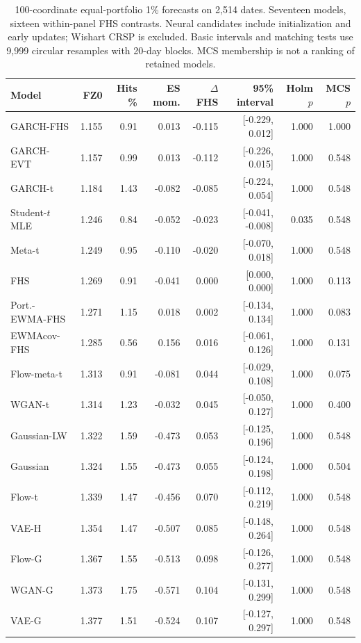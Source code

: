 \documentclass[11pt]{article}
\theoremstyle{definition}\newtheorem{definition}[theorem]{Definition}
\theoremstyle{remark}\newtheorem{remark}[theorem]{Remark}
\begin{document}
\begin{table}[htbp]
\centering\footnotesize
\setlength{\tabcolsep}{4pt}
\begin{tabular}{lrrrrrrr}
\toprule
Model & FZ0 & Hits \% & ES mom. & $\Delta$ FHS & 95\% interval & Holm $p$ & MCS $p$ \\
\midrule
GARCH-FHS & 1.155 & 0.91 & 0.013 & -0.115 & [-0.229, 0.012] & 1.000 & 1.000 \\
GARCH-EVT & 1.157 & 0.99 & 0.013 & -0.112 & [-0.226, 0.015] & 1.000 & 0.548 \\
GARCH-t & 1.184 & 1.43 & -0.082 & -0.085 & [-0.224, 0.054] & 1.000 & 0.548 \\
Student-$t$ MLE & 1.246 & 0.84 & -0.052 & -0.023 & [-0.041, -0.008] & 0.035 & 0.548 \\
Meta-t & 1.249 & 0.95 & -0.110 & -0.020 & [-0.070, 0.018] & 1.000 & 0.548 \\
FHS & 1.269 & 0.91 & -0.041 & 0.000 & [0.000, 0.000] & 1.000 & 0.113 \\
Port.-EWMA-FHS & 1.271 & 1.15 & 0.018 & 0.002 & [-0.134, 0.134] & 1.000 & 0.083 \\
EWMAcov-FHS & 1.285 & 0.56 & 0.156 & 0.016 & [-0.061, 0.126] & 1.000 & 0.131 \\
Flow-meta-t & 1.313 & 0.91 & -0.081 & 0.044 & [-0.029, 0.108] & 1.000 & 0.075 \\
WGAN-t & 1.314 & 1.23 & -0.032 & 0.045 & [-0.050, 0.127] & 1.000 & 0.400 \\
Gaussian-LW & 1.322 & 1.59 & -0.473 & 0.053 & [-0.125, 0.196] & 1.000 & 0.548 \\
Gaussian & 1.324 & 1.55 & -0.473 & 0.055 & [-0.124, 0.198] & 1.000 & 0.504 \\
Flow-t & 1.339 & 1.47 & -0.456 & 0.070 & [-0.112, 0.219] & 1.000 & 0.548 \\
VAE-H & 1.354 & 1.47 & -0.507 & 0.085 & [-0.148, 0.264] & 1.000 & 0.548 \\
Flow-G & 1.367 & 1.55 & -0.513 & 0.098 & [-0.126, 0.277] & 1.000 & 0.548 \\
WGAN-G & 1.373 & 1.75 & -0.571 & 0.104 & [-0.131, 0.299] & 1.000 & 0.548 \\
VAE-G & 1.377 & 1.51 & -0.524 & 0.107 & [-0.127, 0.297] & 1.000 & 0.548 \\
\bottomrule
\end{tabular}
\caption{100-coordinate equal-portfolio 1\% forecasts on 2,514 dates. Seventeen models, sixteen within-panel FHS contrasts. Neural candidates include initialization and early updates; Wishart CRSP is excluded. Basic intervals and matching tests use 9,999 circular resamples with 20-day blocks. MCS membership is not a ranking of retained models.}\label{tab:r4-crsp100-primary}
\end{table}
\end{document}
